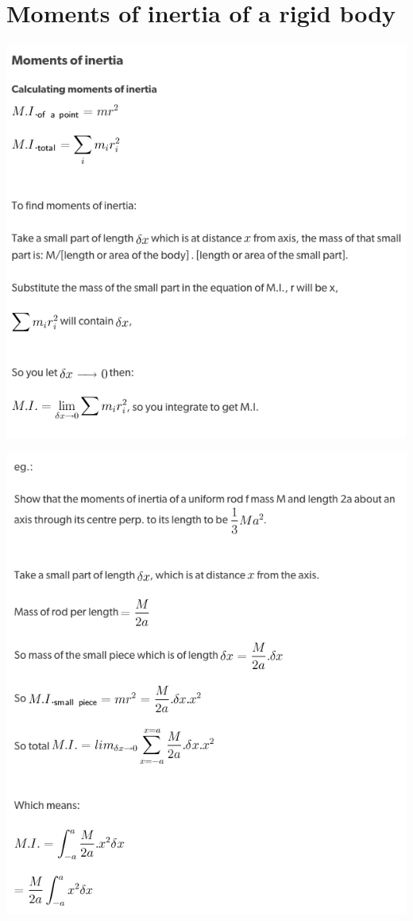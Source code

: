 \documentclass[a4paper]{article}
\begin{document}
\section{Moments of inertia of a rigid body}
\begin{center}
    \includegraphics[scale=0.5]{img_M/23_eg1}
\end{center}
\begin{center}
    \includegraphics[scale=0.5]{img_M/23_eg2}
\end{center}
\end{document}
